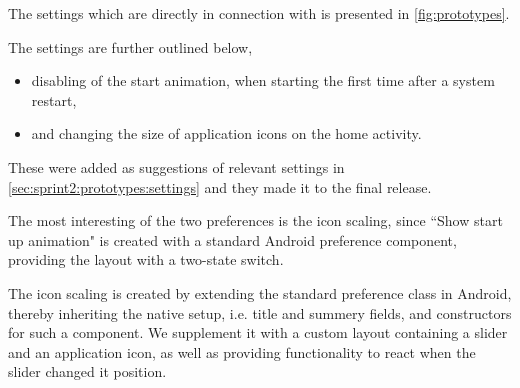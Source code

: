 The settings which are directly in connection with \launcher is presented in \cref{fig:prototypes}.

The settings are further outlined below,
\begin{itemize}
 	\item disabling of the start animation, when starting \launcher the first time after a system restart,
 	\item and changing the size of application icons on the home activity.
\end{itemize} 
These were added as suggestions of relevant \launcher settings in \cref{sec:sprint2:prototypes:settings} and they made it to the final release.

The most interesting of the two preferences is the icon scaling, since ``Show start up animation" is created with a standard Android preference component, providing the layout with a two-state switch.

The icon scaling is created by extending the standard preference class in Android, thereby inheriting the native setup, i.e. title and summery fields, and constructors for such a component.
We supplement it with a custom layout containing a slider and an application icon, as well as providing functionality to react when the slider changed it position.